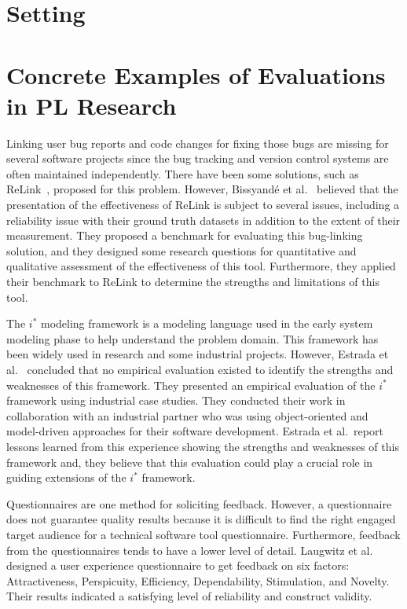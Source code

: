 \section{Setting}


\section{Concrete Examples of Evaluations in PL Research}

Linking user bug reports and code changes for fixing those bugs are missing for several software projects since the bug tracking and version control systems are often maintained independently. There have been some solutions, such as ReLink~\cite{relink}, proposed for this problem. However, Bissyandé et al.~\cite{ee_buglinking} believed that the presentation of the effectiveness of ReLink is subject to several issues, including a reliability issue with their ground truth datasets in addition to the extent of their measurement. They proposed a benchmark for evaluating this bug-linking solution, and they designed some research questions for quantitative and qualitative assessment of the effectiveness of this tool. Furthermore, they applied their benchmark to ReLink to determine the strengths and limitations of this tool.

The $i^*$ modeling framework is a modeling language used in the early system modeling phase to help understand the problem domain. This framework has been widely used in research and some industrial projects. However, Estrada et al.~\cite{ee_framework} concluded that no empirical evaluation existed to identify the strengths and weaknesses of this framework. They presented an empirical evaluation of the $i^*$ framework using industrial case studies. They conducted their work in collaboration with an industrial partner who was using object-oriented and model-driven approaches for their software development. Estrada et al.\ report lessons learned from this experience showing the strengths and weaknesses of this framework and, they believe that this evaluation could play a crucial role in guiding extensions of the $i^*$ framework.

Questionnaires are one method for soliciting feedback. However, a questionnaire does not guarantee quality results because it is difficult to find the right engaged target audience for a technical software tool questionnaire. Furthermore, feedback from the questionnaires tends to have a lower level of detail.
Laugwitz et al.~\cite{laugwitz2008construction} designed a user experience questionnaire to get feedback on six factors: Attractiveness, Perspicuity, Efficiency, Dependability, Stimulation, and Novelty. Their results indicated a satisfying level of reliability and construct validity.

